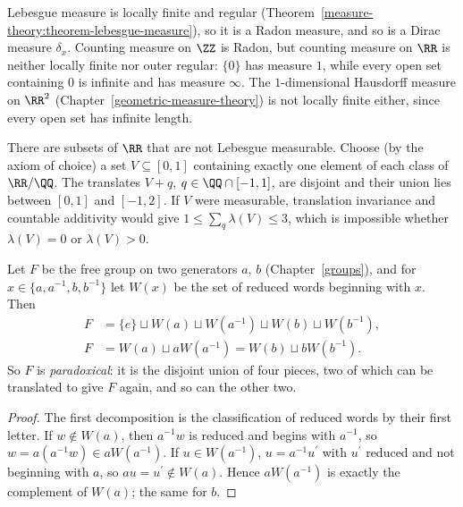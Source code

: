 \begin{example}\label{measure-theory:example-regular}
Lebesgue measure is locally finite and regular (Theorem~\ref{measure-theory:theorem-lebesgue-measure}), so it is a Radon measure, and so is a Dirac measure $\delta_x$. Counting measure on $\ZZ$ is
Radon, but counting measure on $\RR$ is neither locally finite nor outer regular: $\{0\}$ has measure $1$, while every open set containing $0$ is infinite and has measure $\infty$. The
$1$-dimensional Hausdorff measure on $\RR^2$ (Chapter~\ref{geometric-measure-theory}) is not locally finite either, since every open set has infinite length.
\end{example}

\begin{counterexample}\label{measure-theory:counterexample-vitali}
There are subsets of $\RR$ that are not Lebesgue measurable. Choose (by the axiom of choice) a set $V \subseteq [0, 1]$ containing exactly one element of each class of $\RR/\QQ$. The translates $V + q$, $q \in \QQ \cap [-1, 1]$,
are disjoint and their union lies between $[0, 1]$ and $[-1, 2]$. If $V$ were measurable, translation invariance and countable additivity would give $1 \leq \sum_q\lambda(V) \leq 3$, which is impossible
whether $\lambda(V) = 0$ or $\lambda(V) > 0$.
\end{counterexample}

\begin{proposition}\label{measure-theory:proposition-free-group-paradox}
Let $F$ be the free group on two generators $a$, $b$ (Chapter~\ref{groups}), and for $x \in \{a, a^{-1}, b, b^{-1}\}$ let $W(x)$ be the set of reduced words beginning with $x$. Then
\[\begin{aligned}
F &= \{e\} \sqcup W(a) \sqcup W(a^{-1}) \sqcup W(b) \sqcup W(b^{-1}), \\
F &= W(a) \sqcup aW(a^{-1}) = W(b) \sqcup bW(b^{-1}).
\end{aligned}\]
So $F$ is \emph{paradoxical}: it is the disjoint union of four pieces, two of which can be translated to give $F$ again, and so can the other two.
\end{proposition}

\begin{proof}
The first decomposition is the classification of reduced words by their first letter. If $w \notin W(a)$, then $a^{-1}w$ is reduced and begins with $a^{-1}$, so $w = a(a^{-1}w) \in aW(a^{-1})$. If
$u \in W(a^{-1})$, $u = a^{-1}u^{\prime}$ with $u^{\prime}$ reduced and not beginning with $a$, so $au = u^{\prime} \notin W(a)$. Hence $aW(a^{-1})$ is exactly the complement of $W(a)$; the same for $b$.
\end{proof}

